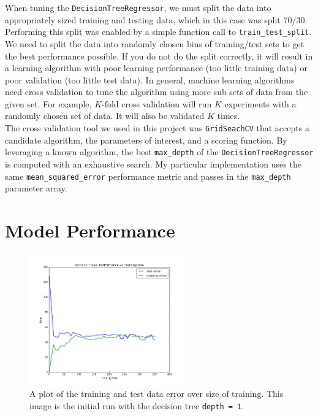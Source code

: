 \documentclass[12pt,letterpaper]{article}
\begin{document}
When tuning the \texttt{DecisionTreeRegressor}, we must split the data into appropriately sized training and testing data, which in this case was split 70/30.
Performing this split was enabled by a simple function call to \verb|train_test_split|.
We need to split the data into randomly chosen bins of training/test sets to get the best performance possible.
If you do not do the split correctly, it will result in a learning algorithm with poor learning performance (too little training data) or poor validation (too little test data).
In general, machine learning algorithms need cross validation to tune the algorithm using more sub sets of data from the given set.
For example, $K$-fold cross validation will run $K$ experiments with a randomly chosen set of data.
It will also be validated $K$ times. \\

The cross validation tool we used in this project was \verb|GridSeachCV| that accepts a candidate algorithm, the parameters of interest, and a scoring function.
By leveraging a known algorithm, the best \verb|max_depth| of the \verb|DecisionTreeRegressor| is computed with an exhaustive search.
My particular implementation uses the same \verb|mean_squared_error| performance metric and passes in the \verb|max_depth| parameter array.

\section*{Model Performance}



\begin{figure}[h!]
	\centering
	\includegraphics[width=0.6\textwidth]{dt-learningcurve-1.png}
	\caption{A plot of the training and test data error over size of training. This image is the initial run with the decision tree \texttt{depth = 1}.}
\end{figure}
\end{document}
